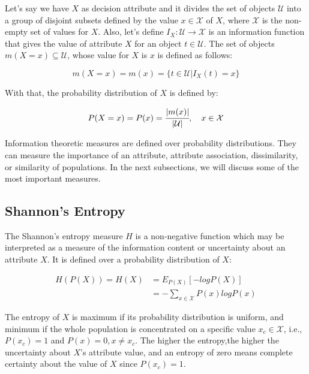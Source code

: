 Let's say we have $X$ as decision attribute and it divides the set of objects $\mathcal{U}$ into a group of disjoint
subsets defined by the value $x \in \mathcal{X}$ of $X$, where $\mathcal{X}$ is the non-empty set of values for
$X$. Also, let's define $I_X : \mathcal{U} \rightarrow \mathcal{X}$ is an information function that gives the value of
attribute $X$ for an object $t \in \mathcal{U}$. The set of objects $m(X=x) \subseteq \mathcal{U}$, whose value for
$X$
is $x$ is defined as follows:

\begin{equation}
 m(X=x)=m(x)=\{t \in \mathcal{U} | I_X(t)=x\}
\end{equation}

With that, the probability distribution of $X$ is defined by:

\begin{equation}
 P(X=x)=P(x)=\cfrac{|m(x)|}{|\mathcal{U}|},\quad x \in \mathcal{X}
\end{equation}

Information theoretic measures are defined over probability distributions. They can measure the importance of an
attribute, attribute association, dissimilarity, or similarity of populations. In the next subsections, we will
discuss some of the most important measures.

\subsection{Shannon's Entropy}

The Shannon's entropy measure $H$ is a non-negative function which may be interpreted as a measure of the information
content or uncertainty about an attribute $X$. It is defined over a probability distribution of $X$:

\begin{equation}
\begin{split}
 H(P(X))=H(X)&=E_{P(X)}[-logP(X)] \\
 &=-\sum_{x \in \mathcal{X}}P(x)logP(x)
\end{split} 
\end{equation}

The entropy of $X$ is maximum if its probability distribution is uniform, and minimum if the whole population is
concentrated on a specific value $x_c \in \mathcal{X}$, i.e., $P(x_c)=1$ and $P(x)=0, x \neq x_c$. The higher the
entropy,the higher the uncertainty about $X$'s attribute value, and an entropy of zero means complete certainty about
the value of $X$ since $P(x_c)=1$.


